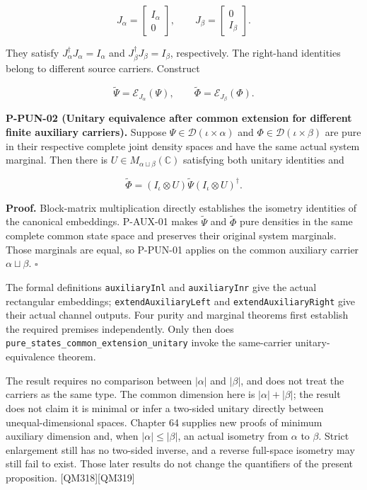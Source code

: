 \documentclass[
  11pt,
  oneside]{book}
\begin{document}
\[
J_\alpha=\begin{bmatrix}I_\alpha\\0\end{bmatrix},
\qquad
J_\beta=\begin{bmatrix}0\\I_\beta\end{bmatrix}.
\]

They satisfy \(J_\alpha^\dagger J_\alpha=I_\alpha\) and
\(J_\beta^\dagger J_\beta=I_\beta\), respectively. The right-hand
identities belong to different source carriers. Construct

\[
\widetilde\Psi=\mathcal E_{J_\alpha}(\Psi),
\qquad
\widetilde\Phi=\mathcal E_{J_\beta}(\Phi).
\]

\label{p-pun-02}{}

\textbf{P-PUN-02 (Unitary equivalence after common extension for
different finite auxiliary carriers).} Suppose
\(\Psi\in\mathcal D(\iota\times\alpha)\) and
\(\Phi\in\mathcal D(\iota\times\beta)\) are pure in their respective
complete joint density spaces and have the same actual system marginal.
Then there is \(U\in M_{\alpha\sqcup\beta}(\mathbb C)\) satisfying both
unitary identities and

\[
\widetilde\Phi
=(I_\iota\otimes U)\widetilde\Psi(I_\iota\otimes U)^\dagger.
\]

\textbf{Proof.} Block-matrix multiplication directly establishes the
isometry identities of the canonical embeddings. P-AUX-01 makes
\(\widetilde\Psi\) and \(\widetilde\Phi\) pure densities in the same
complete common state space and preserves their original system
marginals. Those marginals are equal, so P-PUN-01 applies on the common
auxiliary carrier \(\alpha\sqcup\beta\). \(\square\)

The formal definitions \texttt{auxiliary\allowbreak Inl} and \texttt{auxiliary\allowbreak Inr}
give the actual rectangular embeddings; \texttt{extend\allowbreak Auxiliary\allowbreak Left} and
\texttt{extend\allowbreak Auxiliary\allowbreak Right} give their actual channel outputs. Four
purity and marginal theorems first establish the required premises
independently. Only then does
\texttt{pure\_\allowbreak states\_\allowbreak common\_\allowbreak extension\_\allowbreak unitary} invoke the
same-carrier unitary-equivalence theorem.

The result requires no comparison between \(|\alpha|\) and \(|\beta|\),
and does not treat the carriers as the same type. The common dimension
here is \(|\alpha|+|\beta|\); the result does not claim it is minimal or
infer a two-sided unitary directly between unequal-dimensional spaces.
Chapter 64 supplies new proofs of minimum auxiliary dimension and, when
\(|\alpha|\le|\beta|\), an actual isometry from \(\alpha\) to \(\beta\).
Strict enlargement still has no two-sided inverse, and a reverse
full-space isometry may still fail to exist. Those later results do not
change the quantifiers of the present proposition.
{[}QM318{]}{[}QM319{]}
\end{document}
